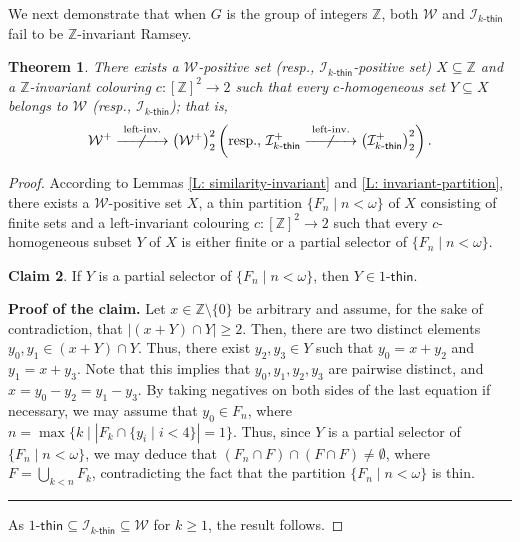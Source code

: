 \documentclass{amsart}
\newtheorem{theorem}{Theorem}[section]
\theoremstyle{definition}
\newtheorem{claim}[theorem]{Claim}
\theoremstyle{remark}
\numberwithin{equation}{section}
\newcommand{\onethin}{1\text{-}\mathsf{thin}}
\newcommand{\kthin}{k\text{-}\mathsf{thin}}
\newenvironment{proofclaim}[1][Proof of the claim]{\textbf{#1.} }{\hfill \rule{0.5em}{0.5em}}
\begin{document}
We next demonstrate that when $G$ is the group of integers $\mathbb{Z}$, both $\mathcal{W}$ and $\mathcal{I}_{\text{$k$-$\mathsf{thin}$}}$ fail to be $\mathbb{Z}$-invariant Ramsey.

\begin{theorem}\label{T:Not Z-invariant Ramsey}
    There exists a $\mathcal{W}$-positive set (resp., $\mathcal{I}_{\kthin}$-positive set) $X \subseteq \mathbb{Z}$ and a $\mathbb{Z}$-invariant colouring $c \colon [\mathbb{Z}]^{2} \longrightarrow 2$ such that every $c$-homogeneous set $Y \subseteq X$ belongs to $\mathcal{W}$ (resp., $\mathcal{I}_{\kthin}$); that is, 
    \[
      \mathcal{W}^{+} \overset{\text{left-inv.}}{ \centernot{\xrightarrow{\hspace{1.1cm}}}} \left(\mathcal{W}^{+}\right)^{2}_{2}
      \left(\text{resp., }\mathcal{I}_{\kthin}^{+} \overset{\text{left-inv.}}{ \centernot{\xrightarrow{\hspace{1.1cm}}}} \left(\mathcal{I}_{\kthin}^{+}\right)^{2}_{2}\right).
    \]
\end{theorem}

\begin{proof}
    According to Lemmas \ref{L: similarity-invariant} and \ref{L: invariant-partition}, there exists a $\mathcal{W}$-positive set $X$, a thin partition $\{F_{n} \mid  n < \omega\}$ of $X$ consisting of finite sets and a left-invariant colouring $c \colon [\mathbb{Z}]^{2} \longrightarrow 2$ such that every $c$-homogeneous subset $Y$ of $X$ is either finite or a partial selector of $\{F_{n} \mid  n < \omega\}$. 
    \begin{claim}
        If $Y$ is a partial selector of $\{F_{n} \mid  n < \omega\}$, then $Y \in \onethin$.
    \end{claim}

    \begin{proofclaim}
         Let $x \in \mathbb{Z} \setminus \{0\}$ be arbitrary and assume, for the sake of contradiction, that $|(x + Y) \cap Y| \geq 2$. Then, there are two distinct elements $y_{0},y_{1} \in (x + Y) \cap Y$. Thus, there exist $y_{2},y_{3} \in Y$ such that $y_{0}=x +y_{2}$ and $y_{1}= x + y_{3}$. Note that this implies that $y_{0},y_{1},y_{2},y_{3}$ are pairwise distinct, and $x=y_{0}-y_{2}=y_{1}-y_{3}$. By taking negatives on both sides of the last equation if necessary, we may assume that $y_{0} \in F_{n}$, where $n=\max\{k \mid |F_{k} \cap \{y_{i} \mid i < 4\}| = 1 \}$. Thus, since $Y$ is a partial selector of $\{F_{n} \mid  n < \omega\}$, we may deduce that $(F_{n} \cap F) \cap (F \cap F) \ne \emptyset$, where $F=\bigcup_{k<n}F_{k}$, contradicting the fact that the partition $\{F_{n} \mid  n < \omega\}$ is thin.
    \end{proofclaim}
    
    As $\onethin \subseteq \mathcal{I}_{\kthin} \subseteq \mathcal{W}$ for $k \geq 1$, the result follows. 
\end{proof}
\end{document}
